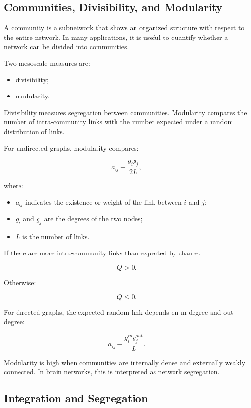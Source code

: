 \subsection{Communities, Divisibility, and Modularity}

A community is a subnetwork that shows an organized structure with respect to the entire network. In many applications, it is useful to quantify whether a network can be divided into communities.

Two mesoscale measures are:

\begin{itemize}[noitemsep]
    \item divisibility;
    \item modularity.
\end{itemize}

Divisibility measures segregation between communities. Modularity compares the number of intra-community links with the number expected under a random distribution of links.

For undirected graphs, modularity compares:

\[
a_{ij}
-
\frac{g_i g_j}{2L},
\]

where:

\begin{itemize}[noitemsep]
    \item $a_{ij}$ indicates the existence or weight of the link between $i$ and $j$;
    \item $g_i$ and $g_j$ are the degrees of the two nodes;
    \item $L$ is the number of links.
\end{itemize}

If there are more intra-community links than expected by chance:

\[
Q > 0.
\]

Otherwise:

\[
Q \leq 0.
\]

For directed graphs, the expected random link depends on in-degree and out-degree:

\[
a_{ij}
-
\frac{g_i^{in}g_j^{out}}{L}.
\]

\begin{authornote}
Modularity is high when communities are internally dense and externally weakly connected. In brain networks, this is interpreted as network segregation.
\end{authornote}

\subsection{Integration and Segregation}

